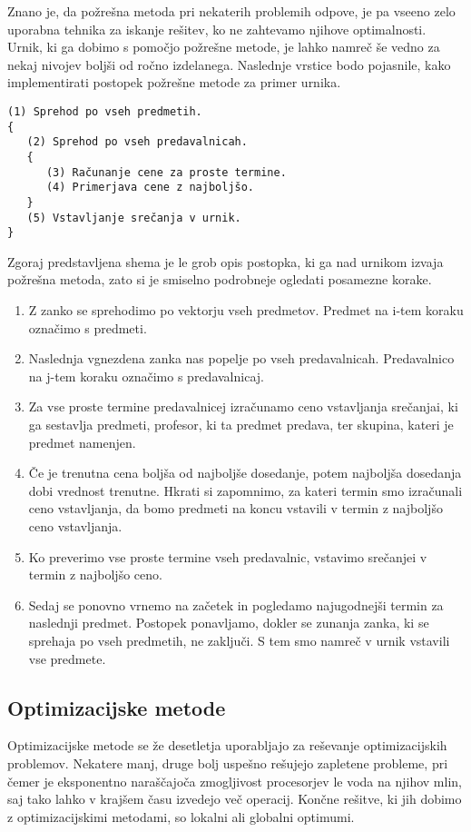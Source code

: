 \documentclass[a4paper,10pt]{article}
\begin{document}
Znano je, da požrešna metoda pri nekaterih problemih odpove, je pa vseeno zelo uporabna
tehnika za iskanje rešitev, ko ne zahtevamo njihove optimalnosti. Urnik, ki ga dobimo s
pomočjo požrešne metode, je lahko namreč še vedno za nekaj nivojev boljši od ročno izdelanega.
Naslednje vrstice bodo pojasnile, kako implementirati postopek požrešne metode za primer urnika.
\begin{verbatim}
(1) Sprehod po vseh predmetih.
{
   (2) Sprehod po vseh predavalnicah.
   {
      (3) Računanje cene za proste termine.
      (4) Primerjava cene z najboljšo.
   }
   (5) Vstavljanje srečanja v urnik.
}
\end{verbatim}
Zgoraj predstavljena shema je le grob opis postopka, ki ga nad urnikom izvaja požrešna metoda,
zato si je smiselno podrobneje ogledati posamezne korake.
\begin{enumerate}
      \item Z zanko se sprehodimo po vektorju vseh predmetov. Predmet na i-tem koraku
      označimo s predmeti.
   
      \item Naslednja vgnezdena zanka nas popelje po vseh predavalnicah. Predavalnico na
      j-tem koraku označimo s predavalnicaj.
   
      \item Za vse proste termine predavalnicej izračunamo ceno vstavljanja
      srečanjai, ki ga sestavlja predmeti, profesor, ki ta predmet predava,
      ter skupina, kateri je predmet namenjen.
   
      \item Če je trenutna cena boljša od najboljše dosedanje, potem najboljša dosedanja
      dobi vrednost trenutne. Hkrati si zapomnimo, za kateri termin smo izračunali ceno
      vstavljanja, da bomo predmeti na koncu vstavili v termin z najboljšo
      ceno vstavljanja.
   
      \item Ko preverimo vse proste termine vseh predavalnic, vstavimo srečanjei
      v termin z najboljšo ceno.
   
      \item Sedaj se ponovno vrnemo na začetek in pogledamo najugodnejši termin za naslednji
      predmet. Postopek ponavljamo, dokler se zunanja zanka, ki se sprehaja po vseh predmetih,
      ne zaključi. S tem smo namreč v urnik vstavili vse predmete.
   \end{enumerate}
\subsection{Optimizacijske metode}
Optimizacijske metode se že desetletja uporabljajo za reševanje optimizacijskih problemov.
Nekatere manj, druge bolj uspešno rešujejo zapletene probleme, pri čemer je eksponentno
naraščajoča zmogljivost procesorjev le voda na njihov mlin, saj tako lahko v krajšem
času izvedejo več operacij. Končne rešitve, ki jih dobimo z optimizacijskimi metodami,
so lokalni ali globalni optimumi.
\end{document}

